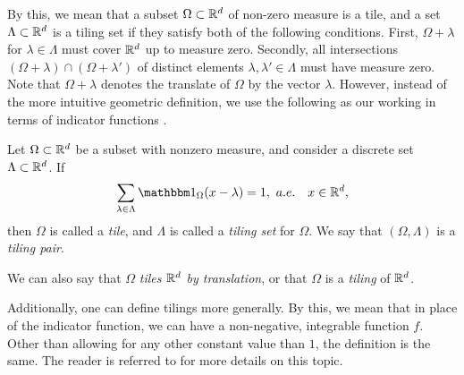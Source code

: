 \documentclass[../thesis.tex]{subfiles}
\begin{document}
By this, we mean that a subset $\Omega \subset \mathbb{R}^d$ of non-zero measure is a tile, and a set $\Lambda \subset \mathbb{R}^d$ is a tiling set if they satisfy both of the following conditions. First, $\Omega+\lambda$ for $\lambda \in \Lambda$ must cover $\mathbb{R}^d$ up to measure zero. Secondly, all intersections $(\Omega+\lambda) \cap (\Omega+\lambda')$ of distinct elements $\lambda,\lambda' \in \Lambda$ must have measure zero. Note that $\Omega+\lambda$ denotes the translate of $\Omega$ by the vector $\lambda$. However, instead of the more intuitive geometric definition, we use the following as our working  in terms of indicator functions \cite{kolountzakisTilingsTranslation2010,kolountzakisStructureTilingsLine1996}.  %
\begin{definition}\label{def:tiling}
    Let $\Omega \subset \mathbb{R}^d$ be a subset with nonzero measure, and consider a discrete set $\Lambda \subset \mathbb{R}^d$. If
    \begin{equation}\label{eq:tiling_set}
        \sum_{\lambda \in \Lambda} \indicator{\Omega}{x-\lambda} = 1, \text{\space} a.e. \quad x \in \R^d,
    \end{equation}
    then $\Omega$ is called a \emph{tile}, and $\Lambda$ is called a \emph{tiling set} for $\Omega$. We say that $(\Omega, \Lambda)$ is a \emph{tiling pair}.
\end{definition}
\begin{remark}
    We can also say that $\Omega$ \emph{tiles $\mathbb{R}^d$ by translation}, or that $\Omega$ is a \emph{tiling} of $\mathbb{R}^d$. 
\end{remark}
\begin{remark}
    Additionally, one can define tilings more generally. By this, we mean that in place of the indicator function, we can have a non-negative, integrable function $f$. Other than allowing for any other constant value than $1$, the definition is the same. The reader is referred to \cite{kolountzakisTilingsTranslation2010,kolountzakisStructureTilingsLine1996} for more details on this topic.
\end{remark}
\end{document}
